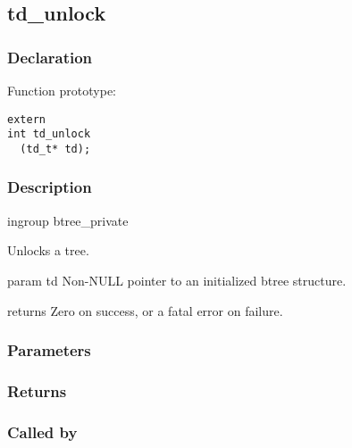 
\newpage
\subsection{td\_unlock}
\subsubsection{Declaration} Function prototype:

\begin{verbatim}
extern
int td_unlock
  (td_t* td);
\end{verbatim}

\subsubsection{Description}


 ingroup btree\_private

 Unlocks a tree.

 param td Non-NULL pointer to an initialized btree structure.

 returns Zero on success, or a fatal error on failure.
 

\subsubsection{Parameters}
\subsubsection{Returns}
\subsubsection{Called by}
